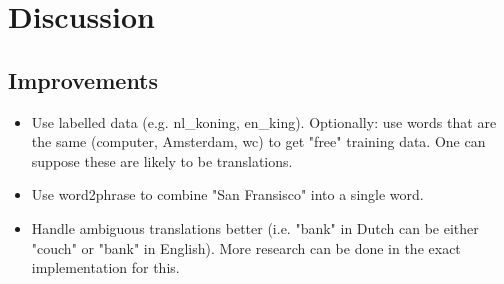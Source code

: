 \section{Discussion}
\label{sec:discussion}

\subsection{Improvements}
\begin{itemize}
\item Use labelled data (e.g. nl\_koning, en\_king). Optionally: use words that are the same (computer, Amsterdam, wc) to get "free" training data. One can suppose these are likely to be translations.
\item Use word2phrase to combine "San Fransisco" into a single word.
\item Handle ambiguous translations better (i.e. "bank" in Dutch can be either "couch" or "bank" in English). More research can be done in the exact implementation for this.
\end{itemize}